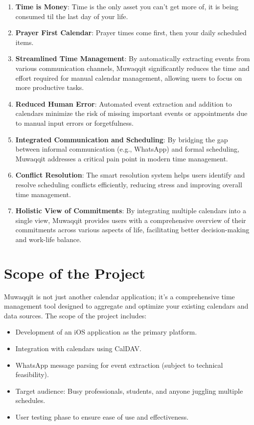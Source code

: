 \documentclass[12pt,a4paper]{article}
\begin{document}
\begin{enumerate}
    \item \textbf{Time is Money}: Time is the only asset you can't get more of, it is being consumed til the last day of your life.
    \item \textbf{Prayer First Calendar}: Prayer times come first, then your daily scheduled items.
    \item \textbf{Streamlined Time Management}: By automatically extracting events from various communication channels, Muwaqqit significantly reduces the time and effort required for manual calendar management, allowing users to focus on more productive tasks.
    \item \textbf{Reduced Human Error}: Automated event extraction and addition to calendars minimize the risk of missing important events or appointments due to manual input errors or forgetfulness.
    \item \textbf{Integrated Communication and Scheduling}: By bridging the gap between informal communication (e.g., WhatsApp) and formal scheduling, Muwaqqit addresses a critical pain point in modern time management.
    \item \textbf{Conflict Resolution}: The smart resolution system helps users identify and resolve scheduling conflicts efficiently, reducing stress and improving overall time management.
    \item \textbf{Holistic View of Commitments}: By integrating multiple calendars into a single view, Muwaqqit provides users with a comprehensive overview of their commitments across various aspects of life, facilitating better decision-making and work-life balance.
\end{enumerate}

\section{Scope of the Project}

Muwaqqit is not just another calendar application; it's a comprehensive time management tool designed to aggregate and optimize your existing calendars and data sources. The scope of the project includes:

\begin{itemize}
    \item Development of an iOS application as the primary platform.
    \item Integration with calendars using CalDAV.
    \item WhatsApp message parsing for event extraction (subject to technical feasibility).
    \item Target audience: Busy professionals, students, and anyone juggling multiple schedules.
    \item User testing phase to ensure ease of use and effectiveness.
\end{itemize}
\end{document}
